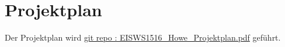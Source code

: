 \chapter{Projektplan}

\begin{comment}
Ein Projektplan wird innerhalb der Projektlaufzeit laufend fortgeführt. Sämtliche Projektaktivitäten werden chronologisch aufgelistet und in Unteraktivitäten gegliedert (mind. drei Gliederungsebenen). Dabei soll zu den Aktivitäten die geplante Zeit gegenüber der tatsächlich verbrauchten Zeit in Stunden angegeben werden. Zudem sollte eine Zuweisung zu den Teammitgliedern erfolgen.
\end{comment}

Der Projektplan wird \href{https://github.com/thuascgn/EISWS1516Howe/blob/master/EISWS1516_Howe_Projektplan.pdf}{git repo : EISWS1516_Howe_Projektplan.pdf} geführt.